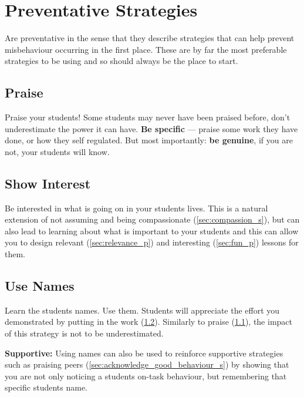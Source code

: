 \documentclass[12pt]{report}
\begin{document}
\chapter{Preventative Strategies}
\label{chap:preventative}

Are preventative in the sense that they describe strategies that can help prevent misbehaviour occurring in the first place. These are by far the most preferable strategies to be using and so should always be the place to start.

\section{Praise}
\label{sec:praise_p}

Praise your students! Some students may never have been praised before, don't underestimate the power it can have. \textbf{Be specific} --- praise some work they have done, or how they self regulated. But most importantly: \textbf{be genuine}, if you are not, your students will know.



\section{Show Interest}
\label{sec:show_interest_p}

Be interested in what is going on in your students lives. This is a natural extension of not assuming and being compassionate (\ref{sec:compassion_s}), but can also lead to learning about what is important to your students and this can allow you to design relevant (\ref{sec:relevance_p}) and interesting (\ref{sec:fun_p}) lessons for them.



\section{Use Names}
\label{sec:use_names_p}

Learn the students names. Use them. Students will appreciate the effort you demonstrated by putting in the work (\ref{sec:show_interest_p}). Similarly to praise (\ref{sec:praise_p}), the impact of this strategy is not to be underestimated.

\textbf{Supportive:} Using names can also be used to reinforce supportive strategies such as praising peers (\ref{sec:acknowledge_good_behaviour_s}) by showing that you are not only noticing a students on-task behaviour, but remembering that specific students name.
\end{document}
